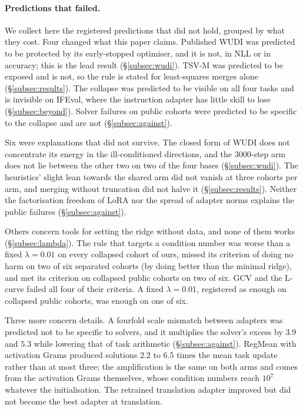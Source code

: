 \paragraph{Predictions that failed.} We collect here the registered
predictions that did not hold, grouped by what they cost. Four changed what
this paper claims. Published WUDI was predicted to be protected by its
early-stopped optimiser, and it is not, in NLL or in accuracy; this is the
lead result (\S\ref{subsec:wudi}). TSV-M was predicted to be exposed and is
not, so the rule is stated for least-squares merges alone
(\S\ref{subsec:results}). The collapse was predicted to be visible on all four
tasks and is invisible on IFEval, where the instruction adapter has little
skill to lose (\S\ref{subsec:beyond}). Solver failures on public cohorts were
predicted to be specific to the collapse and are not (\S\ref{subsec:against}).

Six were explanations that did not survive. The closed form of WUDI does not
concentrate its energy in the ill-conditioned directions, and the 3000-step arm
does not lie between the other two on two of the four bases
(\S\ref{subsec:wudi}). The heuristics' slight lean towards the shared arm did
not vanish at three cohorts per arm, and merging without truncation did not
halve it (\S\ref{subsec:results}). Neither the factorisation freedom of LoRA
nor the spread of adapter norms explains the public failures
(\S\ref{subsec:against}).

Others concern tools for setting the ridge without data, and none of them
works (\S\ref{subsec:lambda}). The rule that targets a condition number was
worse than a fixed $\lambda = 0.01$ on every collapsed cohort of ours, missed
its criterion of doing no harm on two of six separated cohorts (by doing
better than the minimal ridge), and met its criterion on collapsed public
cohorts on two of six. GCV and the L-curve failed all four of their criteria.
A fixed $\lambda = 0.01$, registered as enough on collapsed public cohorts,
was enough on one of six.

Three more concern details. A fourfold scale mismatch between adapters was
predicted not to be specific to solvers, and it multiplies the solver's excess
by $3.9$ and $5.3$ while lowering that of task arithmetic
(\S\ref{subsec:against}). RegMean with activation Grams produced solutions
$2.2$ to $6.5$ times the mean task update rather than at most three; the
amplification is the same on both arms and comes from the activation Grams
themselves, whose condition numbers reach $10^{7}$ whatever the
initialisation. The retrained translation adapter improved but did not become
the best adapter at translation.

